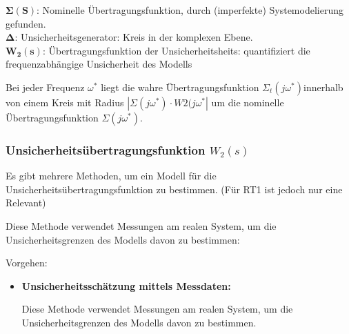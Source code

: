                 $\mathbf{\Sigma(S)}$: Nominelle Übertragungsfunktion, durch (imperfekte) Systemodelierung gefunden.
                \\$\mathbf{\Delta}$: Unsicherheitsgenerator: Kreis in der komplexen Ebene.
                \\$\mathbf{W_2(s)}$: Übertragungsfunktion der Unsicherheitsheits: quantifiziert die frequenzabhängige Unsicherheit des Modells
                
                Bei jeder Frequenz $\omega^*$ liegt die wahre Übertragungsfunktion $\Sigma_t(j\omega^*)$innerhalb von einem Kreis mit Radius $|\Sigma(j\omega^*) \cdot W2(j\omega^*|$ um die nominelle Übertragungsfunktion $\Sigma(j\omega^*)$.
            \subsubsection{Unsicherheitsübertragungsfunktion $W_2(s)$}
                Es gibt mehrere Methoden, um ein Modell für die Unsicherheitsübertragungsfunktion zu bestimmen. (Für RT1 ist jedoch nur eine Relevant)
        
               Diese Methode verwendet Messungen am realen System, um die Unsicherheitsgrenzen des Modells davon zu bestimmen:
               
               Vorgehen: 
               \begin{itemize}
                   \item \textbf{Unsicherheitsschätzung mittels Messdaten:}
                   
                   Diese Methode verwendet Messungen am realen System, um die Unsicherheitsgrenzen des Modells davon zu bestimmen.
                \end{itemize}
                   
